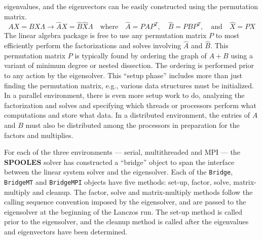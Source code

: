 eigenvalues, and the eigenvectors can be easily constructed
using the permutation matrix.
$$
A X = B X \Lambda
\longrightarrow
{\widehat A} {\widehat X} 
= {\widehat B} {\widehat X} \Lambda
\quad \mbox{where} \quad
{\widehat A} = PAP^T, \quad
{\widehat B} = PBP^T, \quad
\mbox{and} \quad 
{\widehat X} = PX 
$$
The linear algebra package is free to use any permutation matrix
$P$ to most efficiently perform the factorizations and solves
involving ${\widehat A}$ and ${\widehat B}$.
This permutation matrix $P$ is typically found by ordering the
graph of $A + B$ using a variant of minimum degree or nested
dissection.
The ordering is performed prior to any action by the eigensolver.
This ``setup phase'' includes more than just finding the
permutation matrix, e.g., various data structures must be
initialized.
In a parallel environment, there is even more setup work to do,
analyzing the factorization and solves and specifying which threads
or processors perform what computations and store what data.
In a distributed environment, the entries of $A$ and $B$ must 
also be distributed among the processors in preparation for 
the factors and multiplies.
\par
For each of the three environments --- serial, multithreaded and
MPI --- the {\bf SPOOLES} solver has constructed a ``bridge''
object to span the interface between the linear system solver 
and the eigensolver.
Each of the {\tt Bridge}, {\tt BridgeMT} and {\tt BridgeMPI}
objects have five methods: set-up, factor, solve, matrix-multiply
and cleanup.
The factor, solve and matrix-multiply methods follow the calling
sequence convention imposed by the eigensolver, and are passed 
to the eigensolver at the beginning of the Lanczos run.
The set-up method is called prior to the eigensolver, and the
cleanup method is called after the eigenvalues and eigenvectors
have been determined.
